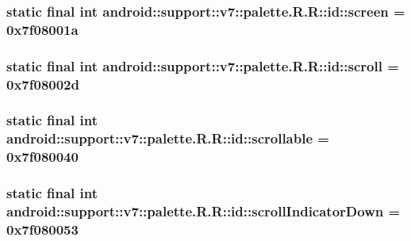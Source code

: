 \hypertarget{classandroid_1_1support_1_1v7_1_1palette_1_1_r_1_1id_b36d32b07adbaef95c82e85f920a99ee}{
\subsubsection[{screen}]{\setlength{\rightskip}{0pt plus 5cm}static final int android::support::v7::palette.R.R::id::screen = 0x7f08001a}}
\label{classandroid_1_1support_1_1v7_1_1palette_1_1_r_1_1id_b36d32b07adbaef95c82e85f920a99ee}


\hypertarget{classandroid_1_1support_1_1v7_1_1palette_1_1_r_1_1id_e95c4e4b2d159456e6b5dec705ab958b}{
\subsubsection[{scroll}]{\setlength{\rightskip}{0pt plus 5cm}static final int android::support::v7::palette.R.R::id::scroll = 0x7f08002d}}
\label{classandroid_1_1support_1_1v7_1_1palette_1_1_r_1_1id_e95c4e4b2d159456e6b5dec705ab958b}


\hypertarget{classandroid_1_1support_1_1v7_1_1palette_1_1_r_1_1id_9d49ae1cce4089ee294ce04352f25e08}{
\subsubsection[{scrollable}]{\setlength{\rightskip}{0pt plus 5cm}static final int android::support::v7::palette.R.R::id::scrollable = 0x7f080040}}
\label{classandroid_1_1support_1_1v7_1_1palette_1_1_r_1_1id_9d49ae1cce4089ee294ce04352f25e08}


\hypertarget{classandroid_1_1support_1_1v7_1_1palette_1_1_r_1_1id_43a9cb422eb45cd002080443cf42d059}{
\subsubsection[{scrollIndicatorDown}]{\setlength{\rightskip}{0pt plus 5cm}static final int android::support::v7::palette.R.R::id::scrollIndicatorDown = 0x7f080053}}
\label{classandroid_1_1support_1_1v7_1_1palette_1_1_r_1_1id_43a9cb422eb45cd002080443cf42d059}


